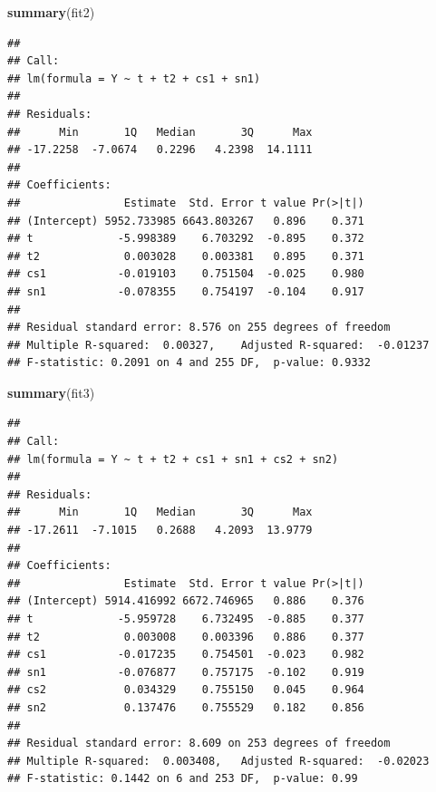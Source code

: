 \documentclass[
  10pt,
]{extarticle}
\newenvironment{Shaded}{\begin{snugshade}}{\end{snugshade}}
\newcommand{\FunctionTok}[1]{\textcolor[rgb]{0.13,0.29,0.53}{\textbf{#1}}}
\newcommand{\NormalTok}[1]{#1}
\begin{document}
\begin{Shaded}
\begin{Highlighting}[]
\FunctionTok{summary}\NormalTok{(fit2)}
\end{Highlighting}
\end{Shaded}

\begin{verbatim}
## 
## Call:
## lm(formula = Y ~ t + t2 + cs1 + sn1)
## 
## Residuals:
##      Min       1Q   Median       3Q      Max 
## -17.2258  -7.0674   0.2296   4.2398  14.1111 
## 
## Coefficients:
##                Estimate  Std. Error t value Pr(>|t|)
## (Intercept) 5952.733985 6643.803267   0.896    0.371
## t             -5.998389    6.703292  -0.895    0.372
## t2             0.003028    0.003381   0.895    0.371
## cs1           -0.019103    0.751504  -0.025    0.980
## sn1           -0.078355    0.754197  -0.104    0.917
## 
## Residual standard error: 8.576 on 255 degrees of freedom
## Multiple R-squared:  0.00327,    Adjusted R-squared:  -0.01237 
## F-statistic: 0.2091 on 4 and 255 DF,  p-value: 0.9332
\end{verbatim}

\begin{Shaded}
\begin{Highlighting}[]
\FunctionTok{summary}\NormalTok{(fit3)}
\end{Highlighting}
\end{Shaded}

\begin{verbatim}
## 
## Call:
## lm(formula = Y ~ t + t2 + cs1 + sn1 + cs2 + sn2)
## 
## Residuals:
##      Min       1Q   Median       3Q      Max 
## -17.2611  -7.1015   0.2688   4.2093  13.9779 
## 
## Coefficients:
##                Estimate  Std. Error t value Pr(>|t|)
## (Intercept) 5914.416992 6672.746965   0.886    0.376
## t             -5.959728    6.732495  -0.885    0.377
## t2             0.003008    0.003396   0.886    0.377
## cs1           -0.017235    0.754501  -0.023    0.982
## sn1           -0.076877    0.757175  -0.102    0.919
## cs2            0.034329    0.755150   0.045    0.964
## sn2            0.137476    0.755529   0.182    0.856
## 
## Residual standard error: 8.609 on 253 degrees of freedom
## Multiple R-squared:  0.003408,   Adjusted R-squared:  -0.02023 
## F-statistic: 0.1442 on 6 and 253 DF,  p-value: 0.99
\end{verbatim}
\end{document}
